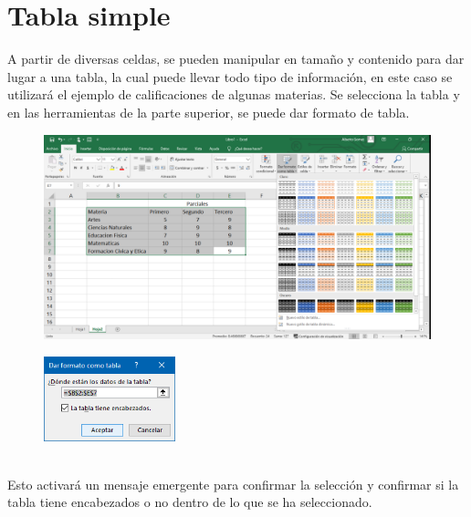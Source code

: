 \documentclass[12pt,a4paper]{book}
\begin{document}
\section{Tabla simple}
A partir de diversas celdas, se pueden manipular en tamaño y contenido para dar lugar a una tabla, la cual puede llevar todo tipo de información, en este caso se utilizará el ejemplo de calificaciones de algunas materias.
Se selecciona la tabla y en las herramientas de la parte superior, se puede dar formato de tabla.
\\
\begin{figure}[h]
	\centering
    \includegraphics[width=16cm]{excel7}
\end{figure}
\begin{figure}
    \centering
    \includegraphics[width=3.8cm]{excel8}
\end{figure}
\\
Esto activará un mensaje emergente para confirmar la selección y confirmar si la tabla tiene encabezados o no dentro de lo que se ha seleccionado.


\clearpage
\end{document}
